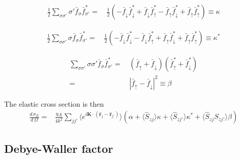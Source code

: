 \documentclass[11pt,letter]{article}
\newcommand{\bv}[1]{\ensuremath{\bm{#1}}}
\newcommand{\dsig}[1]{\ensuremath{ \frac{ d\,\sigma_{#1} }{d\,\Omega} }}
\begin{document}
\begin{equation}
\begin{split}
\frac{1}{2} \sum_{\sigma\sigma'} \sigma'\bar{f}_{\sigma} \bar{f}_{\sigma'}^{*} = &\,  
  \frac{1}{2} ( 
            - \bar{f}_{\downarrow}\bar{f}_{\downarrow}^{*} 
            + \bar{f}_{\downarrow}\bar{f}_{\uparrow}^{*} 
            - \bar{f}_{\uparrow}\bar{f}_{\downarrow}^{*} 
            + \bar{f}_{\uparrow}\bar{f}_{\uparrow}^{*} ) \equiv \kappa 
\end{split} 
\end{equation} 

\begin{equation}
\begin{split}
\frac{1}{2} \sum_{\sigma\sigma'} \sigma \bar{f}_{\sigma} \bar{f}_{\sigma'}^{*} = &\, 
  \frac{1}{2} ( 
            - \bar{f}_{\downarrow}\bar{f}_{\downarrow}^{*} 
            - \bar{f}_{\downarrow}\bar{f}_{\uparrow}^{*} 
            + \bar{f}_{\uparrow}\bar{f}_{\downarrow}^{*} 
            + \bar{f}_{\uparrow}\bar{f}_{\uparrow}^{*} ) \equiv \kappa^{*}
\end{split} 
\end{equation} 

\begin{equation}
\begin{split}
\sum_{\sigma\sigma'} \sigma\sigma' \bar{f}_{\sigma} \bar{f}_{\sigma'}^{*} = &\, 
            (\bar{f}_{\uparrow} + \bar{f}_{\downarrow})( \bar{f}_{\uparrow}^{*} + \bar{f}_{\downarrow}^{*} ) \\
       =&\,  | \bar{f}_{\uparrow} - \bar{f}_{\downarrow} | ^{2} \equiv \beta
\end{split} 
\end{equation}

The elastic cross section is then 
\begin{equation}
\begin{split}
\dsig{E} =&   \frac{9\Lambda}{4k^{2}} 
               \sum_{ j j' }  \langle 
              e^{ i \bv{K} \cdot ( \hat{\bv{r}}_{j} - \hat{\bv{r}}_{j'} )  } \rangle 
             \left( \alpha + \langle \hat{S}_{zj}\rangle \kappa + \langle \hat{S}_{zj'} \rangle \kappa^{*} 
                     + \langle \hat{S}_{zj} \hat{S}_{zj'} \rangle \beta \right)   
\end{split}
\end{equation}

\subsection{Debye-Waller factor} 
\end{document}

